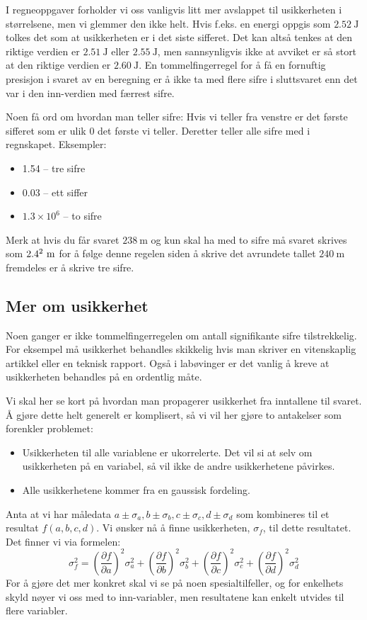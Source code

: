 \documentclass[a4paper,norsk,12pt]{article}
\begin{document}
I regneoppgaver forholder vi oss vanligvis litt mer avslappet til usikkerheten i størrelsene, men vi glemmer den ikke helt. Hvis f.eks. en energi oppgis som $2.52~\mathrm{J}$ tolkes det som at usikkerheten er i det siste sifferet. Det kan altså tenkes at den riktige verdien er $2.51~\mathrm{J}$ eller $2.55~\mathrm{J}$, men sannsynligvis ikke at avviket er så stort at den riktige verdien er $2.60~\mathrm{J}$. En tommelfingerregel for å få en fornuftig presisjon i svaret av en beregning er å ikke ta med flere sifre i sluttsvaret enn det var i den inn-verdien med færrest sifre.

Noen få ord om hvordan man teller sifre: Hvis vi teller fra venstre er det første sifferet som er ulik 0 det første vi teller. Deretter teller alle sifre med i regnskapet. Eksempler:
\begin{itemize}
	\item 1.54 -- tre sifre
	\item 0.03 -- ett siffer
	\item$1.3\times10^6$ -- to sifre
\end{itemize}
Merk at hvis du får svaret $238~\mathrm{m}$ og kun skal ha med to sifre må svaret skrives som $2.4\time10^2~\mathrm{m}$ for å følge denne regelen siden å skrive det avrundete tallet $240~\mathrm{m}$ fremdeles er å skrive tre sifre.

\subsection{Mer om usikkerhet}
Noen ganger er ikke tommelfingerregelen om antall signifikante sifre tilstrekkelig. For eksempel må usikkerhet behandles skikkelig hvis man skriver en vitenskaplig artikkel eller en teknisk rapport. Også i labøvinger er det vanlig å kreve at usikkerheten behandles på en ordentlig måte. 

Vi skal her se kort på hvordan man propagerer usikkerhet fra inntallene til svaret. Å gjøre dette helt generelt er komplisert, så vi vil her gjøre to antakelser som forenkler problemet:
\begin{itemize}
\item
Usikkerheten til alle variablene er ukorrelerte. Det vil si at selv om usikkerheten på en variabel, så vil ikke de andre 	usikkerhetene påvirkes.
\item
Alle usikkerhetene kommer fra en gaussisk fordeling. 
\end{itemize}
Anta at vi har måledata $a\pm\sigma_a,b\pm\sigma_b,c\pm\sigma_c,d\pm\sigma_d$ som kombineres til et resultat $f(a,b,c,d)$. Vi ønsker nå å finne usikkerheten, $\sigma_f$, til dette resultatet. Det finner vi via formelen:
\begin{displaymath}
	\sigma_f^2 =
	\left(\frac{\partial f}{\partial a}\right)^2\sigma_a^2 + \left(\frac{\partial f}{\partial b}\right)^2\sigma_b^2 + 
	\left(\frac{\partial f}{\partial c}\right)^2\sigma_c^2 + \left(\frac{\partial f}{\partial d}\right)^2\sigma_d^2 
\end{displaymath}
For å gjøre det mer konkret skal vi se på noen spesialtilfeller, og for enkelhets skyld nøyer vi oss med to inn-variabler, men resultatene kan enkelt utvides til flere variabler.
\end{document}
